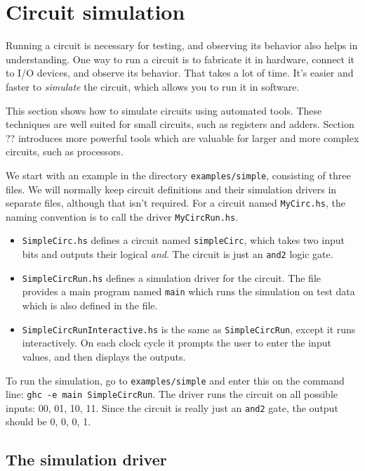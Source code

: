 \documentclass[11pt]{article}
\begin{document}
\section{Circuit simulation}
\label{sec:org54689cb}

Running a circuit is necessary for testing, and observing its behavior
also helps in understanding.  One way to run a circuit is to fabricate
it in hardware, connect it to I/O devices, and observe its behavior.
That takes a lot of time.  It's easier and faster to \emph{simulate} the
circuit, which allows you to run it in software.

This section shows how to simulate circuits using automated tools.
These techniques are well suited for small circuits, such as registers
and adders.  Section ??  introduces more powerful tools which are
valuable for larger and more complex circuits, such as processors.

We start with an example in the directory \texttt{examples/simple},
consisting of three files.  We will normally keep circuit definitions
and their simulation drivers in separate files, although that isn't
required.  For a circuit named \texttt{MyCirc.hs}, the naming convention is
to call the driver \texttt{MyCircRun.hs}.

\begin{itemize}
\item \texttt{SimpleCirc.hs} defines a circuit named \texttt{simpleCirc}, which takes
two input bits and outputs their logical \emph{and}.  The circuit is just
an \texttt{and2} logic gate.

\item \texttt{SimpleCircRun.hs} defines a simulation driver for the circuit.  The
file provides a main program named \texttt{main} which runs the simulation
on test data which is also defined in the file.

\item \texttt{SimpleCircRunInteractive.hs} is the same as \texttt{SimpleCircRun}, except
it runs interactively.  On each clock cycle it prompts the user to
enter the input values, and then displays the outputs.
\end{itemize}

To run the simulation, go to \texttt{examples/simple} and enter this on the
command line: \texttt{ghc -e main SimpleCircRun}.  The driver runs the
circuit on all possible inputs: 00, 01, 10, 11.  Since the circuit is
really just an \texttt{and2} gate, the output should be 0, 0, 0, 1.

\subsection{The simulation driver}
\label{sec:org69e4eec}
\end{document}
